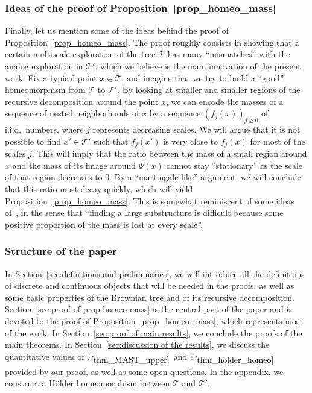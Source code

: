 \documentclass[11pt]{article}
\newcommand{\Tt}{\mathcal{T}}
\let\eps\varepsilon
\theoremstyle{plain}
\theoremstyle{definition}
\numberwithin{equation}{section}
\begin{document}
\subsubsection*{Ideas of the proof of Proposition~\ref{prop_homeo_mass}}
Finally, let us mention some of the ideas behind the proof of Proposition~\ref{prop_homeo_mass}. The proof roughly consists in showing that a certain multiscale exploration of the tree $\Tt$ has many ``mismatches'' with the analog exploration in $\Tt'$, which we believe is the main innovation of the present work.
Fix a typical point $x \in \Tt$, and imagine that we try to build a ``good'' homeomorphism from $\Tt$ to $\Tt'$. By looking at smaller and smaller regions of the recursive decomposition around the point $x$, we can encode the masses of a sequence of nested neighborhoods of $x$ by a sequence $\left(f_j(x) \right)_{j \geq 0}$ of
i.i.d.\ numbers, where $j$ represents decreasing scales.
We will argue that it is not possible to find $x' \in \Tt'$ such that $f_j(x')$ is very close to $f_j(x)$ for most of the scales $j$.
This will imply that the ratio between the mass of a small region around $x$ and the mass of its image around $\Psi(x)$ cannot stay ``stationary'' as the scale of that region decreases to $0$.
By a ``martingale-like'' argument, we will conclude that this ratio must decay quickly, which will yield Proposition~\ref{prop_homeo_mass}. This is somewhat reminiscent of some ideas of~\cite{BBDFGMP22}, in the sense that ``finding a large substructure is difficult because some positive proportion of the mass is lost at every scale''.

\subsubsection*{Structure of the paper}
In Section~\ref{sec:definitions and preliminaries}, we will introduce all the definitions of discrete and continuous objects that will be needed in the proofs, as well as some basic properties of the Brownian tree and of its recursive decomposition.
Section~\ref{sec:proof of prop homeo mass} is the central part of the paper and is devoted to the proof of Proposition~\ref{prop_homeo_mass}, which represents most of the work.
In Section~\ref{sec:proof of main results}, we conclude the proofs of the main theorems.
In Section~\ref{sec:discussion of the results}, we discuss the quantitative values of $\eps_{\ref{thm_MAST_upper}}$ and $\eps_{\ref{thm_holder_homeo}}$ provided by our proof, as well as some open questions.
In the appendix, we construct a Hölder homeomorphism between $\Tt$ and $\Tt'$.
\end{document}
